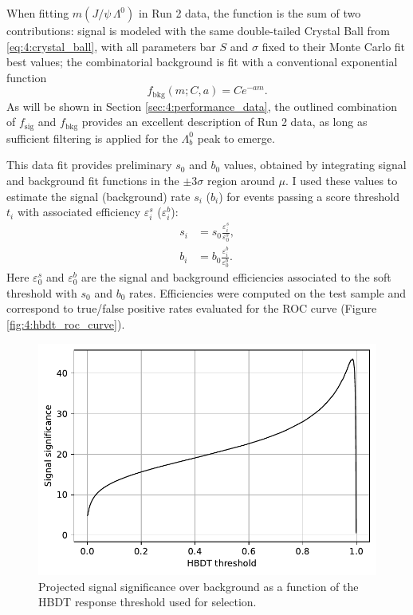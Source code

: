 When fitting $m(J/\psi\,\Lambda^0)$ in Run 2 data, the function is the sum of two contributions:
signal is modeled with the same double-tailed Crystal Ball from \eqref{eq:4:crystal_ball}, with all parameters bar $S$ and $\sigma$ fixed to their Monte Carlo fit best values;
the combinatorial background is fit with a conventional exponential function
\begin{equation}
	f_\text{bkg} (m;C,a) = C e^{-a m}.
	\label{eq:4:exponential}
\end{equation}
As will be shown in Section \ref{sec:4:performance_data}, the outlined combination of $f_\text{sig}$ and $f_\text{bkg}$ provides an excellent description of Run 2 data, as long as sufficient filtering is applied for the $\Lambda_b^0$ peak to emerge.

This data fit provides preliminary $s_0$ and $b_0$ values, obtained by integrating signal and background fit functions in the $\pm 3\sigma$ region around $\mu$.
I used these values to estimate the signal (background) rate $s_i$ ($b_i$) for events passing a score threshold $t_i$ with associated efficiency $\varepsilon_i^s$ ($\varepsilon_i^b$):
\begin{subequations}
\begin{align}
	s_i &= s_0 \frac{\varepsilon_i^s}{\varepsilon_0^s}, \\
	b_i &= b_0 \frac{\varepsilon_i^b}{\varepsilon_0^b}.
\end{align}
\end{subequations}
Here $\varepsilon_0^s$ and $\varepsilon_0^b$ are the signal and background efficiencies associated to the soft threshold with $s_0$ and $b_0$ rates.
Efficiencies were computed on the test sample and correspond to true/false positive rates evaluated for the ROC curve (Figure \ref{fig:4:hbdt_roc_curve}).

\begin{figure}
	\centering
	\includegraphics[width=.6\textwidth]{graphics/04-event_selection/HBDT_signal_significance.pdf}
	\caption{Projected \demonstratorshort signal significance over background as a function of the HBDT response threshold used for selection.}
	\label{fig:4:signal_significance}
\end{figure}

